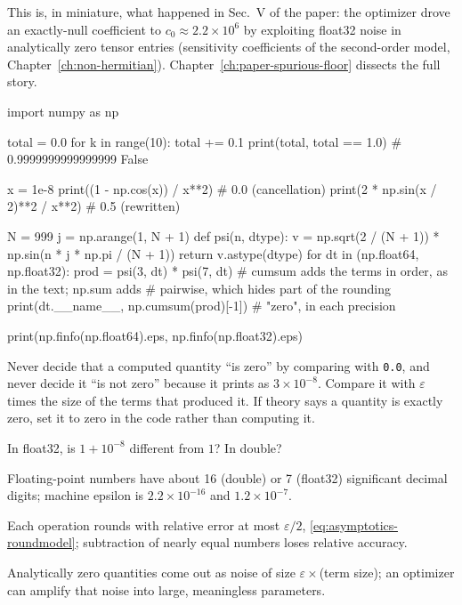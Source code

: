 This is, in miniature, what happened in Sec.~V of the paper: the optimizer drove an exactly-null coefficient to $c_0\approx2.2\times10^{6}$ by exploiting float32 noise in analytically zero tensor entries (sensitivity coefficients of the second-order model, Chapter~\ref{ch:non-hermitian}). Chapter~\ref{ch:paper-spurious-floor} dissects the full story.

\begin{pycode}
import numpy as np

total = 0.0
for k in range(10):
    total += 0.1
print(total, total == 1.0)            # 0.9999999999999999 False

x = 1e-8
print((1 - np.cos(x)) / x**2)         # 0.0   (cancellation)
print(2 * np.sin(x / 2)**2 / x**2)    # 0.5   (rewritten)

N = 999
j = np.arange(1, N + 1)
def psi(n, dtype):
    v = np.sqrt(2 / (N + 1)) * np.sin(n * j * np.pi / (N + 1))
    return v.astype(dtype)
for dt in (np.float64, np.float32):
    prod = psi(3, dt) * psi(7, dt)
    # cumsum adds the terms in order, as in the text; np.sum adds
    # pairwise, which hides part of the rounding
    print(dt.__name__, np.cumsum(prod)[-1])   # "zero", in each precision

print(np.finfo(np.float64).eps, np.finfo(np.float32).eps)
\end{pycode}

\begin{pitfall}
Never decide that a computed quantity ``is zero'' by comparing with \texttt{0.0}, and never decide it ``is not zero'' because it prints as $3\times10^{-8}$. Compare it with $\varepsilon$ times the size of the terms that produced it. If theory says a quantity is exactly zero, set it to zero in the code rather than computing it.
\end{pitfall}

\begin{checkpoint}
In float32, is $1+10^{-8}$ different from $1$? In double?
\end{checkpoint}

\begin{keyideas}
\item Floating-point numbers have about 16 (double) or 7 (float32) significant decimal digits; machine epsilon is $2.2\times10^{-16}$ and $1.2\times10^{-7}$.
\item Each operation rounds with relative error at most $\varepsilon/2$, \cref{eq:asymptotics-roundmodel}; subtraction of nearly equal numbers loses relative accuracy.
\item Analytically zero quantities come out as noise of size $\varepsilon\times$(term size); an optimizer can amplify that noise into large, meaningless parameters.
\end{keyideas}

